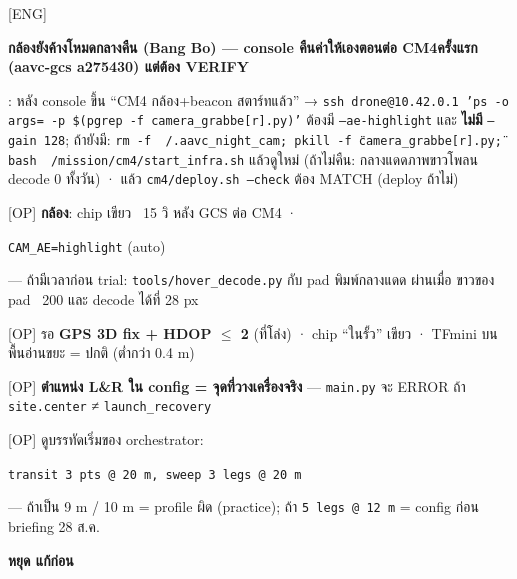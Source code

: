 \documentclass[11pt,a4paper]{article}
\newcommand{\code}[1]{\texttt{\small #1}}
\newcommand{\hl}[1]{\colorbox{hlyel}{\strut #1}}
\newcommand{\hlr}[1]{\colorbox{hlred}{\strut\color{stopred}\bfseries #1}}
\newcommand{\who}[1]{{\small\color{blu}[#1]}}
\begin{document}
\begin{cl}
\item \who{ENG} \hl{\textbf{กล้องยังค้างโหมดกลางคืน (Bang Bo) — console คืนค่าให้เองตอนต่อ CM4ครั้งแรก (aavc-gcs a275430) แต่ต้อง VERIFY}}: หลัง console ขึ้น ``CM4 กล้อง+beacon สตาร์ทแล้ว'' → \code{ssh drone@10.42.0.1 'ps -o args= -p \$(pgrep -f camera_grabbe[r].py)'} ต้องมี \code{--ae-highlight} และ \textbf{ไม่มี} \code{--gain 128}; ถ้ายังมี: \code{rm -f ~/.aavc_night_cam; pkill -f \"camera_grabbe[r].py\"; bash ~/mission/cm4/start_infra.sh} แล้วดูใหม่ (ถ้าไม่คืน: กลางแดดภาพขาวโพลน decode 0 ทั้งวัน) · แล้ว \code{cm4/deploy.sh --check} ต้อง MATCH (deploy ถ้าไม่)
\item \who{OP} \textbf{กล้อง}: chip เขียว ~15 วิ หลัง GCS ต่อ CM4 · \hl{\code{CAM_AE=highlight} (auto)} — ถ้ามีเวลาก่อน trial: \code{tools/hover_decode.py} กับ pad พิมพ์กลางแดด ผ่านเมื่อ ขาวของ pad ~200 และ decode ได้ที่ 28 px
\item \who{OP} รอ \textbf{GPS 3D fix + HDOP $\leq$ 2} (ที่โล่ง) · chip ``ในรั้ว'' เขียว · TFmini บนพื้นอ่านขยะ = ปกติ (ต่ำกว่า 0.4 m)
\item \who{OP} \textbf{ตำแหน่ง L\&R ใน config = จุดที่วางเครื่องจริง} — \code{main.py} จะ ERROR ถ้า \code{site.center} ≠ \code{launch_recovery}
\item \who{OP} ดูบรรทัดเริ่มของ orchestrator: \hl{\code{transit 3 pts @ 20 m, sweep 3 legs @ 20 m}} — ถ้าเป็น 9 m / 10 m = profile ผิด (practice); ถ้า \code{5 legs @ 12 m} = config ก่อน briefing 28 ส.ค. \hlr{หยุด แก้ก่อน}
\end{cl}

\end{document}

